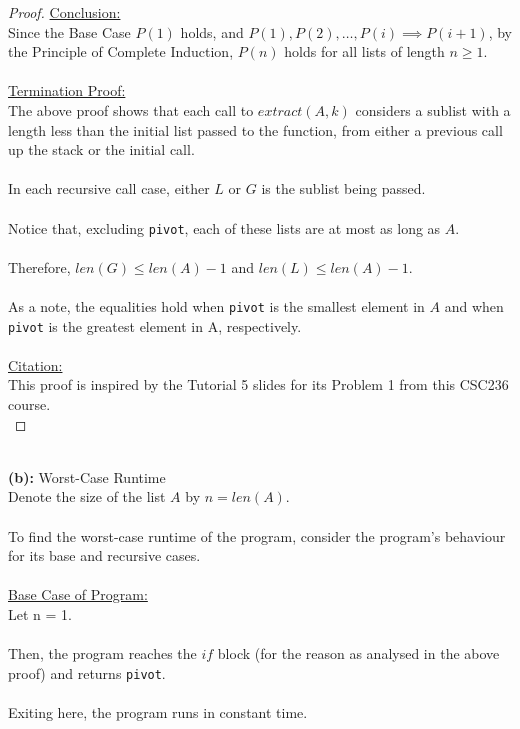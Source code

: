 \documentclass[12pt]{article}
\begin{document}
\begin{proof}
    \underline{Conclusion:} \\
    Since the Base Case $P(1)$ holds, and $P(1), P(2), \dots, P(i) \implies P(i + 1)$, by the Principle of Complete Induction, $P(n)$ holds for all lists of length $n \geq 1$. \\
    \\
    \underline{Termination Proof:} \\
    The above proof shows that each call to $extract(A, k)$ considers a sublist with a length less than the initial list passed to the function, from either a previous call up the stack or the initial call. \\
    \\
    In each recursive call case, either $L$ or $G$ is the sublist being passed. \\
    \\
    Notice that, excluding \texttt{pivot}, each of these lists are at most as long as $A$. \\
    \\
    Therefore, $len(G) \leq len(A) - 1$ and $len(L) \leq len(A) - 1$. \\
    \\
    As a note, the equalities hold when \texttt{pivot} is the smallest element in $A$ and when \texttt{pivot} is the greatest element in A, respectively. \\
    \\
    \underline{Citation:} \\
    This proof is inspired by the Tutorial 5 slides for its Problem 1 from this CSC236 course. \\
\end{proof}
\leavevmode\\
\textbf{(b):} Worst-Case Runtime \\
Denote the size of the list $A$ by $n = len(A)$. \\
\\
To find the worst-case runtime of the program, consider the program's behaviour for its base and recursive cases. \\
\\
\underline{Base Case of Program:} \\
Let n = 1. \\
\\
Then, the program reaches the $if$ block (for the reason as analysed in the above proof) and returns \texttt{pivot}. \\
\\
Exiting here, the program runs in constant time. \\
\end{document}
